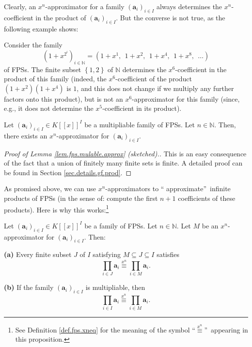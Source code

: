 Clearly, an $x^{n}$-approximator for a family $\left(  \mathbf{a}_{i}\right)
_{i\in I}$ always determines the $x^{n}$-coefficient in the product of
$\left(  \mathbf{a}_{i}\right)  _{i\in I}$. But the converse is not true, as
the following example shows:

\begin{example}
Consider the family
\[
\left(  1+x^{2^{i}}\right)  _{i\in\mathbb{N}}=\left(  1+x^{1},\ \ 1+x^{2}%
,\ \ 1+x^{4},\ \ 1+x^{8},\ \ \ldots\right)
\]
of FPSs. The finite subset $\left\{  1,2\right\}  $ of $\mathbb{N}$ determines
the $x^{6}$-coefficient in the product of this family (indeed, the $x^{6}%
$-coefficient of the product $\left(  1+x^{2}\right)  \left(  1+x^{4}\right)
$ is $1$, and this does not change if we multiply any further factors onto
this product), but is not an $x^{6}$-approximator for this family (since,
e.g., it does not determine the $x^{5}$-coefficient in its product).
\end{example}

\begin{lemma}
\label{lem.fps.mulable.approx}Let $\left(  \mathbf{a}_{i}\right)  _{i\in I}\in
K\left[  \left[  x\right]  \right]  ^{I}$ be a multipliable family of FPSs.
Let $n\in\mathbb{N}$. Then, there exists an $x^{n}$-approximator for $\left(
\mathbf{a}_{i}\right)  _{i\in I}$.
\end{lemma}

\begin{proof}
[Proof of Lemma \ref{lem.fps.mulable.approx} (sketched).]This is an easy
consequence of the fact that a union of finitely many finite sets is finite. A
detailed proof can be found in Section \ref{sec.details.gf.prod}.
\end{proof}

As promised above, we can use $x^{n}$-approximators to \textquotedblleft
approximate\textquotedblright\ infinite products of FPSs (in the sense of:
compute the first $n+1$ coefficients of these products). Here is why this
works:\footnote{See Definition \ref{def.fps.xneq} for the meaning of the
symbol \textquotedblleft$\overset{x^{n}}{\equiv}$\textquotedblright\ appearing
in this proposition.}

\begin{proposition}
\label{prop.fps.infprod-approx-xneq}Let $\left(  \mathbf{a}_{i}\right)  _{i\in
I}\in K\left[  \left[  x\right]  \right]  ^{I}$ be a family of FPSs. Let
$n\in\mathbb{N}$. Let $M$ be an $x^{n}$-approximator for $\left(
\mathbf{a}_{i}\right)  _{i\in I}$. Then: \medskip

\textbf{(a)} Every finite subset $J$ of $I$ satisfying $M\subseteq J\subseteq
I$ satisfies%
\[
\prod_{i\in J}\mathbf{a}_{i}\overset{x^{n}}{\equiv}\prod_{i\in M}%
\mathbf{a}_{i}.
\]


\textbf{(b)} If the family $\left(  \mathbf{a}_{i}\right)  _{i\in I}$ is
multipliable, then
\[
\prod_{i\in I}\mathbf{a}_{i}\overset{x^{n}}{\equiv}\prod_{i\in M}%
\mathbf{a}_{i}.
\]

\end{proposition}

